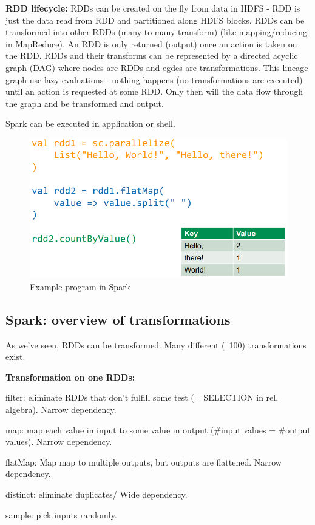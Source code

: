 \documentclass[11pt,oneside,a4paper]{article}
\begin{document}
\textbf{RDD lifecycle:} RDDs can be created on the fly from data in HDFS - RDD is just the data read from RDD and partitioned along HDFS blocks. RDDs can be transformed into other RDDs (many-to-many transform) (like mapping/reducing in MapReduce). An RDD is only returned (output) once an action is taken on the RDD. RDDs and their transforms can be represented by a directed acyclic graph (DAG) where nodes are RDDs and egdes are transformations. This lineage graph use lazy evaluations - nothing happens (no transformations are executed) until an action is requested at some RDD. Only then will the data flow through the graph and be transformed and output.

Spark can be executed in application or shell.

\begin{figure}[hb!]
	\centering
	\includegraphics[width=0.35\linewidth]{figures/spark_hello_world}
	\caption{Example program in Spark}
	\label{fig:sparkhelloworld}
\end{figure}


\subsection{Spark: overview of transformations}

As we've seen, RDDs can be transformed. Many different (~100) transformations exist.

\textbf{Transformation on one RDDs:}
\begin{compactitem}
\item filter: eliminate RDDs that don't fulfill some test (= SELECTION in rel. algebra). Narrow dependency.
\item map: map each value in input to some value in output (\#input values = \#output values). Narrow dependency.
\item flatMap: Map map to multiple outputs, but outputs are flattened. Narrow dependency.
\item distinct: eliminate duplicates/ Wide dependency.
\item sample: pick inputs randomly.
\end{compactitem}
\end{document}
